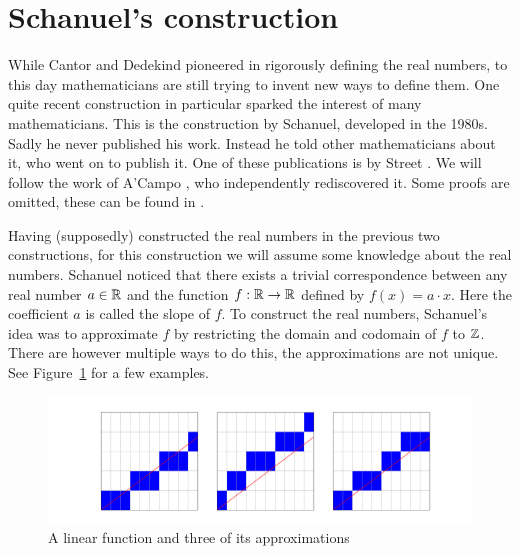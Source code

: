 \documentclass[../main.tex]{subfiles}
\begin{document}
\section{Schanuel's construction}\label{sec:the_real_numbers:schanuels_construction}
While Cantor and Dedekind pioneered in rigorously defining the real numbers, to this day mathematicians are still trying to invent new ways to define them. One quite recent construction in particular sparked the interest of many mathematicians. This is the construction by Schanuel, developed in the 1980s. Sadly he never published his work. Instead he told other mathematicians about it, who went on to publish it. One of these publications is by Street \cite{Street1985}. We will follow the work of A'Campo \cite{ACampo2003}, who independently rediscovered it. Some proofs are omitted, these can be found in \cite{ACampo2003}.

Having (supposedly) constructed the real numbers in the previous two constructions, for this construction we will assume some knowledge about the real numbers. Schanuel noticed that there exists a trivial correspondence between any real number $a\in\mathbb{R}$ and the function $f:\mathbb{R}\to\mathbb{R}$ defined by $f(x)=a\cdot x$. Here the coefficient $a$ is called the slope of $f$. To construct the real numbers, Schanuel's idea was to approximate $f$ by restricting the domain and codomain of $f$ to $\mathbb{Z}$. There are however multiple ways to do this, the approximations are not unique. See Figure~\ref{fig:the_real_numbers:schanuel_function_approximation} for a few examples.

\begin{figure}[!htbp]
    \centering
    \includegraphics[width=\linewidth]{figures/schanuel_function_approximation.png}
    \caption{A linear function and three of its approximations}
    \label{fig:the_real_numbers:schanuel_function_approximation}
\end{figure}
\end{document}
